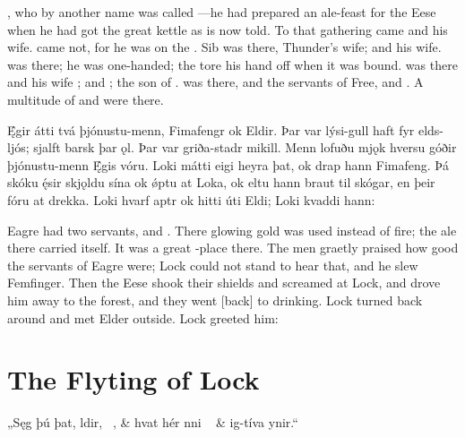 \bpb {}, who by another name was called —he had prepared an ale-feast for the Eese when he had got the great kettle as is now told. To that gathering came  and  his wife.  came not, for he was on the . Sib was there, Thunder’s wife;  and  his wife.  was there; he was one-handed; the  tore his hand off when it was bound.  was there and his wife ;  and ;  the son of .  was there, and the servants of Free,  and . A multitude of  and  were there.\epb\epg


\bpg\bpa Ę́gir átti tvá þjónustu-menn, Fimafengr ok Eldir. Þar var lýsi-gull haft fyr elds-ljós; sjalft barsk þar ǫl. Þar var griða-stadr mikill. Menn lofuðu mjǫk hversu góðir þjónustu-menn Ę́gis vóru. Loki mátti eigi heyra þat, ok drap hann Fimafeng. Þá skóku ę́sir skjǫldu sína ok ǿptu at Loka, ok eltu hann braut til skógar, en þeir fóru at drekka. Loki hvarf aptr ok hitti úti Eldi; Loki kvaddi hann:\epa

\bpb Eagre had two servants,  and . There glowing gold was used instead of fire; the ale there carried itself. It was a great -place there. The men graetly praised how good the servants of Eagre were; Lock could not stand to hear that, and he slew Femfinger. Then the Eese shook their shields and screamed at Lock, and drove him away to the forest, and they went [back] to drinking. Lock turned back around and met Elder outside. Lock greeted him:\epb\epg

\sectionline

\section{The Flyting of Lock}

\bvg\bva%
„Sęg þú þat, ldir, \hld\ , &
hvat hér nni \hld\  &
\ind {}ig-tíva ynir.“\eva

